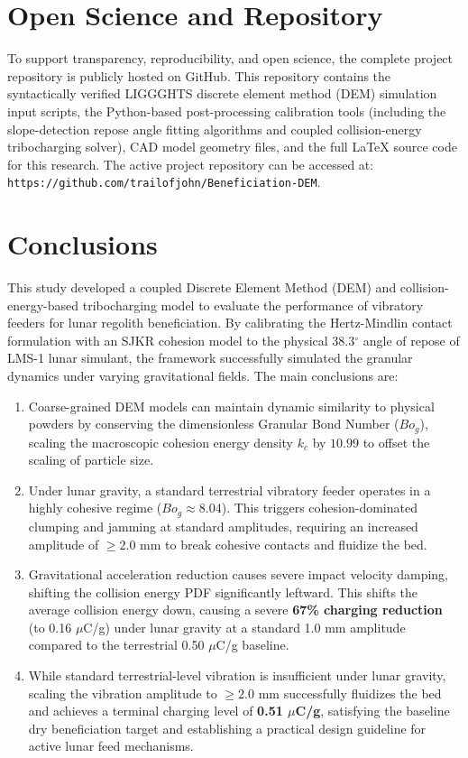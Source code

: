 \documentclass[preprint,12pt,authoryear]{elsarticle}
\begin{document}
\section*{Open Science and Repository}
To support transparency, reproducibility, and open science, the complete project repository is publicly hosted on GitHub. This repository contains the syntactically verified LIGGGHTS discrete element method (DEM) simulation input scripts, the Python-based post-processing calibration tools (including the slope-detection repose angle fitting algorithms and coupled collision-energy tribocharging solver), CAD model geometry files, and the full LaTeX source code for this research. The active project repository can be accessed at: \texttt{https://github.com/trailofjohn/Beneficiation-DEM}.

\section{Conclusions}
\label{sec:conclusions}

This study developed a coupled Discrete Element Method (DEM) and collision-energy-based tribocharging model to evaluate the performance of vibratory feeders for lunar regolith beneficiation. By calibrating the Hertz-Mindlin contact formulation with an SJKR cohesion model to the physical 38.3$^\circ$ angle of repose of LMS-1 lunar simulant, the framework successfully simulated the granular dynamics under varying gravitational fields. The main conclusions are:
\begin{enumerate}
    \item Coarse-grained DEM models can maintain dynamic similarity to physical powders by conserving the dimensionless Granular Bond Number ($Bo_g$), scaling the macroscopic cohesion energy density $k_c$ by $10.99$ to offset the scaling of particle size.
    \item Under lunar gravity, a standard terrestrial vibratory feeder operates in a highly cohesive regime ($Bo_g \approx 8.04$). This triggers cohesion-dominated clumping and jamming at standard amplitudes, requiring an increased amplitude of $\ge 2.0\text{ mm}$ to break cohesive contacts and fluidize the bed.
    \item Gravitational acceleration reduction causes severe impact velocity damping, shifting the collision energy PDF significantly leftward. This shifts the average collision energy down, causing a severe \textbf{67\% charging reduction} (to 0.16 $\mu$C/g) under lunar gravity at a standard 1.0 mm amplitude compared to the terrestrial 0.50 $\mu$C/g baseline.
    \item While standard terrestrial-level vibration is insufficient under lunar gravity, scaling the vibration amplitude to $\ge 2.0$ mm successfully fluidizes the bed and achieves a terminal charging level of \textbf{0.51 $\mu$C/g}, satisfying the baseline dry beneficiation target and establishing a practical design guideline for active lunar feed mechanisms.
\end{enumerate}



\nocite{*}

\end{document}
